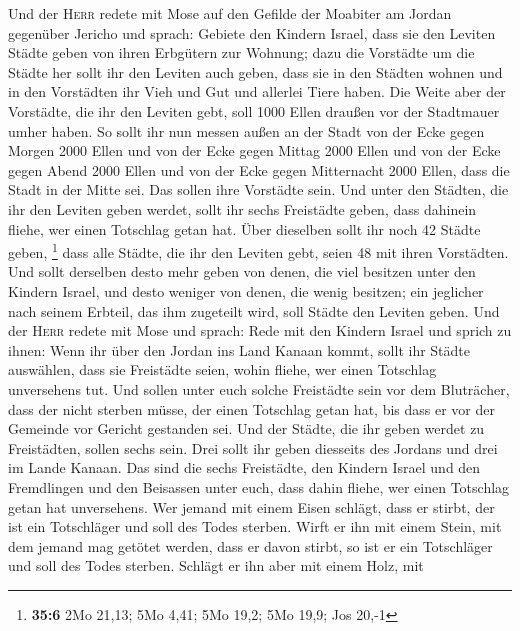  Und der \textsc{Herr} redete mit Mose auf den Gefilde der
Moabiter am Jordan gegenüber Jericho und sprach:  Gebiete
den Kindern Israel, dass sie den Leviten Städte geben von ihren
Erbgütern zur Wohnung;  dazu die Vorstädte um die Städte
her sollt ihr den Leviten auch geben, dass sie in den Städten wohnen und
in den Vorstädten ihr Vieh und Gut und allerlei Tiere haben.
 Die Weite aber der Vorstädte, die ihr den Leviten gebt,
soll 1000 Ellen draußen vor der Stadtmauer umher haben. 
So sollt ihr nun messen außen an der Stadt von der Ecke gegen Morgen
2000 Ellen und von der Ecke gegen Mittag 2000 Ellen und von der Ecke
gegen Abend 2000 Ellen und von der Ecke gegen Mitternacht 2000 Ellen,
dass die Stadt in der Mitte sei. Das sollen ihre Vorstädte sein.
 Und unter den Städten, die ihr den Leviten geben werdet,
sollt ihr sechs Freistädte geben, dass dahinein fliehe, wer einen
Totschlag getan hat. Über dieselben sollt ihr noch 42 Städte geben,
\footnote{\textbf{35:6} 2Mo 21,13; 5Mo 4,41; 5Mo 19,2; 5Mo 19,9; Jos
  20,-1}  dass alle Städte, die ihr den Leviten gebt,
seien 48 mit ihren Vorstädten.  Und sollt derselben desto
mehr geben von denen, die viel besitzen unter den Kindern Israel, und
desto weniger von denen, die wenig besitzen; ein jeglicher nach seinem
Erbteil, das ihm zugeteilt wird, soll Städte den Leviten geben.
 Und der \textsc{Herr} redete mit Mose und sprach:
 Rede mit den Kindern Israel und sprich zu ihnen: Wenn
ihr über den Jordan ins Land Kanaan kommt,  sollt ihr
Städte auswählen, dass sie Freistädte seien, wohin fliehe, wer einen
Totschlag unversehens tut.  Und sollen unter euch solche
Freistädte sein vor dem Bluträcher, dass der nicht sterben müsse, der
einen Totschlag getan hat, bis dass er vor der Gemeinde vor Gericht
gestanden sei.  Und der Städte, die ihr geben werdet zu
Freistädten, sollen sechs sein.  Drei sollt ihr geben
diesseits des Jordans und drei im Lande Kanaan.  Das sind
die sechs Freistädte, den Kindern Israel und den Fremdlingen und den
Beisassen unter euch, dass dahin fliehe, wer einen Totschlag getan hat
unversehens.  Wer jemand mit einem Eisen schlägt, dass er
stirbt, der ist ein Totschläger und soll des Todes sterben.
 Wirft er ihn mit einem Stein, mit dem jemand mag getötet
werden, dass er davon stirbt, so ist er ein Totschläger und soll des
Todes sterben.  Schlägt er ihn aber mit einem Holz, mit
